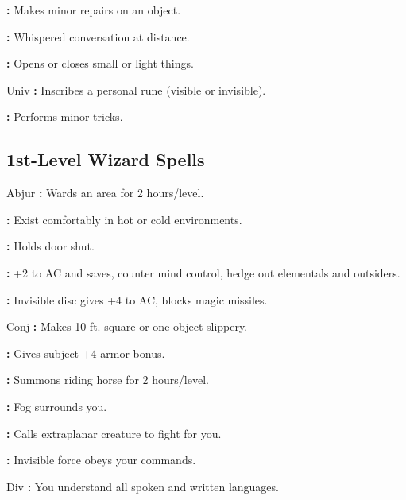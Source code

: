 \begin{multicols}{2}
\begin{description*}
\item \tabto{5mm} \textbf{:} Makes minor repairs on an object.
\item \tabto{5mm} \textbf{:} Whispered conversation at distance.
\item \tabto{5mm} \textbf{:} Opens or closes small or light things.
\item Univ \tabto{5mm} \textbf{:} Inscribes a personal rune (visible or invisible).
\item \tabto{5mm} \textbf{:} Performs minor tricks.
\end{description*}

\subsection{1st-Level Wizard Spells}
\begin{description*}
\item Abjur \tabto{5mm} \textbf{:} Wards an area for 2 hours/level.
\item \tabto{5mm} \textbf{:} Exist comfortably in hot or cold environments.
\item \tabto{5mm} \textbf{:} Holds door shut.
\item \tabto{5mm} \textbf{:} +2 to AC and saves, counter mind control, hedge out elementals and outsiders.
\item \tabto{5mm} \textbf{:} Invisible disc gives +4 to AC, blocks magic missiles.
\item Conj \tabto{5mm} \textbf{:} Makes 10-ft. square or one object slippery.
\item \tabto{5mm} \textbf{:} Gives subject +4 armor bonus.
\item \tabto{5mm} \textbf{:} Summons riding horse for 2 hours/level.
\item \tabto{5mm} \textbf{:} Fog surrounds you.
\item \tabto{5mm} \textbf{:} Calls extraplanar creature to fight for you.
\item \tabto{5mm} \textbf{:} Invisible force obeys your commands.
\item Div \tabto{5mm} \textbf{:} You understand all spoken and written languages.

\end{description*}
\end{multicols}
